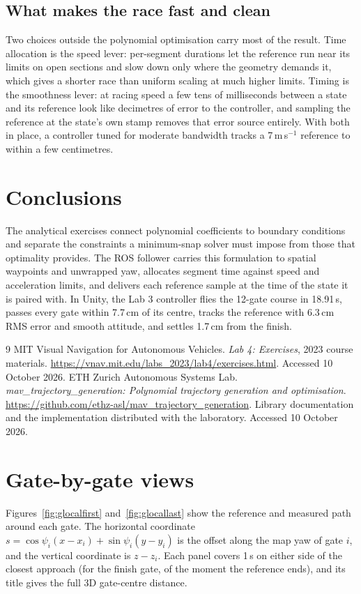 \documentclass[12pt,a4paper,twoside]{article}
\begin{document}
\subsection{What makes the race fast and clean}
Two choices outside the polynomial optimisation carry most of the result. Time
allocation is the speed lever: per-segment durations let the reference run near
its limits on open sections and slow down only where the geometry demands it,
which gives a shorter race than uniform scaling at much higher limits. Timing is
the smoothness lever: at racing speed a few tens of milliseconds between a state
and its reference look like decimetres of error to the controller, and sampling
the reference at the state's own stamp removes that error source entirely. With
both in place, a controller tuned for moderate bandwidth tracks a
7\,m\,s$^{-1}$ reference to within a few centimetres.

\section{Conclusions}
The analytical exercises connect polynomial coefficients to boundary conditions
and separate the constraints a minimum-snap solver must impose from those that
optimality provides. The ROS follower carries this formulation to spatial
waypoints and unwrapped yaw, allocates segment time against speed and
acceleration limits, and delivers each reference sample at the time of the state
it is paired with. In Unity, the Lab 3 controller flies the 12-gate course in
18.91\,s, passes every gate within 7.7\,cm of its centre, tracks the reference
with 6.3\,cm RMS error and smooth attitude, and settles 1.7\,cm from the finish.

\begingroup\small\setlength{\bibsep}{2pt}\begin{thebibliography}{9}
 MIT Visual Navigation for Autonomous Vehicles.
\emph{Lab 4: Exercises}, 2023 course materials.
\url{https://vnav.mit.edu/labs_2023/lab4/exercises.html}.
Accessed 10 October 2026.
 ETH Zurich Autonomous Systems Lab.
\emph{mav\_trajectory\_generation: Polynomial trajectory generation and optimisation}.
\url{https://github.com/ethz-asl/mav_trajectory_generation}.
Library documentation and the implementation distributed with the laboratory.
Accessed 10 October 2026.
\end{thebibliography}\endgroup

\appendix
\section{Gate-by-gate views}
\label{sec:gateatlas}
Figures~\ref{fig:glocalfirst} and~\ref{fig:glocallast} show the reference and
measured path around each gate. The horizontal coordinate
$s=\cos\psi_i(x-x_i)+\sin\psi_i(y-y_i)$ is the offset along the map yaw of gate
$i$, and the vertical coordinate is $z-z_i$. Each panel covers 1\,s on either side
of the closest approach (for the finish gate, of the moment the reference ends),
and its title gives the full 3D gate-centre distance.
\end{document}
